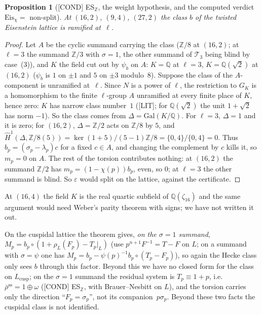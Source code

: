\documentclass[11pt]{article}
\newcommand{\Z}{\mathbb{Z}}
\newcommand{\Q}{\mathbb{Q}}
\newcommand{\LIT}{\textsf{\small[LIT]}}
\newcommand{\PGCOND}{\textsf{\small[COND]}}
\newtheorem*{proposition*}{Proposition}
\begin{document}
\begin{proposition*}[\PGCOND{} ES$_{\Z}$, the weight hypothesis, and the computed verdict $\mathrm{Eis}_\chi=$ non-split] At $(16,2)$, $(9,4)$, $(27,2)$ the class $b$ of the twisted Eisenstein lattice is ramified at~$\ell$.\end{proposition*}
\begin{proof} Let $A$ be the cyclic summand carrying the class ($\Z/8$ at $(16,2)$; at $\ell=3$ the summand $\Z/3$ with $\sigma=1$, the other summand of $\mathcal T_3$ being blind by case~(3)), and $K$ the field cut out by $\psi_b$ on $A$: $K=\Q$ at $\ell=3$, $K=\Q(\sqrt2)$ at $(16,2)$ ($\psi_b$ is $1$ on $\pm1$ and $5$ on $\pm3$ modulo~$8$). Suppose the class of the $A$-component is unramified at~$\ell$. Since $N$ is a power of $\ell$, the restriction to $G_K$ is a homomorphism to the finite $\ell$-group $A$ unramified at every finite place of $K$, hence zero: $K$ has narrow class number~$1$ (\LIT; for $\Q(\sqrt2)$ the unit $1+\sqrt2$ has norm $-1$). So the class comes from $\Delta=\mathrm{Gal}(K/\Q)$. For $\ell=3$, $\Delta=1$ and it is zero; for $(16,2)$, $\Delta=\Z/2$ acts on $\Z/8$ by $5$, and $\widehat H^{1}(\Delta,\Z/8(5))=\ker(1+5)/(5-1)\Z/8=\{0,4\}/\{0,4\}=0$. Thus $b_p=(\sigma_p-\lambda_p)c$ for a fixed $c\in A$, and changing the complement by $c$ kills it, so $m_p=0$ on $A$. The rest of the torsion contributes nothing: at $(16,2)$ the summand $\Z/2$ has $m_p=(1-\chi(p))b_p$, even, so $0$; at $\ell=3$ the other summand is blind. So $\varepsilon$ would split on the lattice, against the certificate. \end{proof}
At $(16,4)$ the field $K$ is the real quartic subfield of $\Q(\zeta_{16})$ and the same argument would need Weber's parity theorem with signs; we have not written it out.

On the cuspidal lattice the theorem gives, \emph{on the $\sigma=1$ summand}, $M_p=b_p\circ(1+\rho_L(F_p)-T_p|_L)$ (use $p^{n+1}F^{-1}=T-F$ on $L$; on a summand with $\sigma=\psi$ one has $M_p=b_p-\psi(p)^{-1}b_p\circ(T_p-F_p)$), so again the Hecke class only sees $b$ through this factor. Beyond this we have no closed form for the class on $L_{\mathrm{cusp}}$; on the $\sigma=1$ summand the residual system is $T_p\equiv1+p$, i.e.\ $\bar\rho^{\mathrm{ss}}=1\oplus\omega$ (\PGCOND{} ES$_\Z$, with Brauer--Nesbitt on $L$), and the torsion carries only the direction ``$F_p=\sigma_p$'', not its companion~$p\sigma_p$. Beyond these two facts the cuspidal class is not identified.
\end{document}

